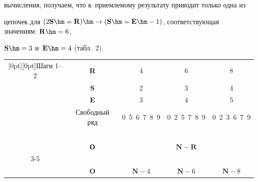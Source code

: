 вычисления, получаем, что к~приемлемому результату приводит только одна из 


цепочек для $(2\mathbf{S}\hm = \mathbf{R}) \hm\to (\mathbf{S}\hm = 


\mathbf{E}\hm- 1)$, соответствующая значениям: $\mathbf{R}\hm = 6$, 


$\mathbf{S}\hm = 3$ и~$\mathbf{E}\hm = 4$ (табл.~2).


 


 \begin{table}\small %


 \begin{center}




 \vspace*{2ex}


 


 \tabcolsep=7pt


 \begin{tabular}{|c|c|c|c|c|}


 \hline


 \multicolumn{1}{|c|}{\raisebox{-18pt}[0pt][0pt]{Шаги 1--2}}&\textbf{R}&4&6&8\\




 &\textbf{S}&2&3&4\\




 &\textbf{E}&3&4&5\\




 &{Свободный ряд}&0~5~6~7~8~9&0~2~5~7~8~9&0\ 2\ 3\ 6\ 7\ 9\\


 \hline


 &&\multicolumn{3}{c|}{\ }\\[-9pt]


&\textbf{О}&\multicolumn{3}{c|}{$\mathbf{N} - \mathbf{R}$}\\


  \cline{3-5}


 &&\multicolumn{3}{c|}{\ }\\[-9pt]


  &\textbf{O}&$\mathbf{N} - 4$ &$\mathbf{N} - 6$ &$\mathbf{N}- 8$ \\



\end{tabular}
\end{center}
\end{table}
